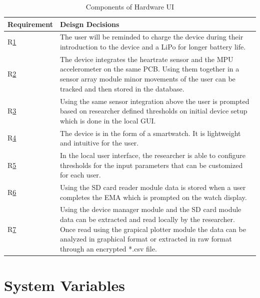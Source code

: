 \documentclass[12pt, titlepage]{article}
\begin{document}
\begin{table}[H]
	\begin{tabular}{|p{3cm} | p{12cm}| }
		 \hline
		 \textbf{Requirement} & \textbf{Deisgn Decisions} \\
		\hline
		R\href{https://github.com/zakerl/Capstone_Project/blob/main/docs/SRS/SRS.pdf}{1}  & The user will be reminded to charge the device during their introduction to the device and a LiPo for longer battery life. \\		 
		\hline
		R\href{https://github.com/zakerl/Capstone_Project/blob/main/docs/SRS/SRS.pdf}{2} & The device integrates the heartrate sensor and the MPU accelerometer on the same PCB. Using them together in a sensor array module minor movements of the user can be tracked and then stored in the database. \\
		\hline
		 R\href{https://github.com/zakerl/Capstone_Project/blob/main/docs/SRS/SRS.pdf}{3} & Using the same sensor integration above the user is prompted based on researcher defined thresholds on initial device setup which is done in the local GUI. \\
		\hline
		R\href{https://github.com/zakerl/Capstone_Project/blob/main/docs/SRS/SRS.pdf}{4} & The device is in the form of a smartwatch. It is lightweight and intuitive for the user. \\
		\hline
		R\href{https://github.com/zakerl/Capstone_Project/blob/main/docs/SRS/SRS.pdf}{5} & In the local user interface, the researcher is able to configure thresholds for the input parameters that can be customized for each user. \\
		 \hline
		R\href{https://github.com/zakerl/Capstone_Project/blob/main/docs/SRS/SRS.pdf}{6}  & Using the SD card reader module data is stored when a user completes the EMA which is prompted on the watch display. \\
		\hline 
		 R\href{https://github.com/zakerl/Capstone_Project/blob/main/docs/SRS/SRS.pdf}{7}& Using the device manager module and the SD card module data can be extracted and read locally by the researcher. Once read using the grapical plotter module the data can be analyzed in graphical format or extracted in raw format through an encrypted *.csv file. \\
		\hline
	\end{tabular}
\caption{\label{Hardware User Interface}Components of Hardware UI}  
\end{table}

\section{System Variables}
\end{document}
